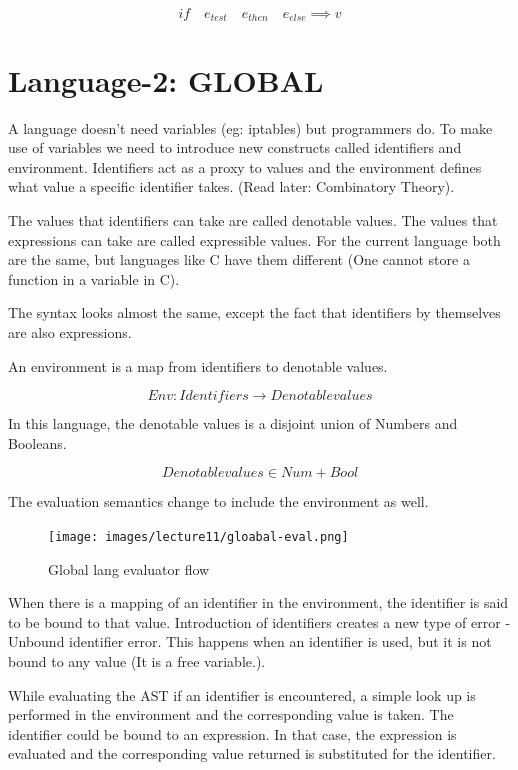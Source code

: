     \begin{displaymath}
        if \quad e_{test} \quad e_{then} \quad e_{else} \implies v
    \end{displaymath}

    \section{Language-2: GLOBAL}

    A language doesn't need variables (eg: iptables) but programmers do. To make use of variables we need to introduce new constructs called identifiers and environment. Identifiers act as a proxy to values and the environment defines what value a specific identifier takes. (Read later: Combinatory Theory).

    The values that identifiers can take are called denotable values. The values that expressions can take are called expressible values. For the current language both are the same, but languages like C have them different (One cannot store a function in a variable in C).

    The syntax looks almost the same, except the fact that identifiers by themselves are also expressions.

    An environment is a map from identifiers to denotable values.
    
    $$Env: Identifiers \rightarrow Denotable values$$

    In this language, the denotable values is a disjoint union of Numbers and Booleans.

    $$ Denotable values \in Num + Bool $$

    The evaluation semantics change to include the environment as well. 

    \begin{figure}[htbp]
        \center
        \texttt{[image: images/lecture11/gloabal-eval.png]}
        \caption{Global lang evaluator flow}
    \end{figure}

    When there is a mapping of an identifier in the environment, the identifier is said to be bound to that value. Introduction of identifiers creates a new type of error - Unbound identifier error. This happens when an identifier is used, but it is not bound to any value (It is a free variable.).

    While evaluating the AST if an identifier is encountered, a simple look up is performed in the environment and the corresponding value is taken. The identifier could be bound to an expression. In that case, the expression is evaluated and the corresponding value returned is substituted for the identifier.

